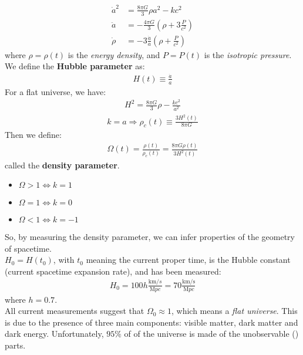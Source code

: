 \documentclass[../PhysUniverse.tex]{subfiles}
\begin{document}
\begin{align*}
\dot{a}^2 &= \frac{8\pi G}{3}\rho a^2 - kc^2\\
\ddot{a} &= -\frac{4\pi G}{3}\left(\rho + 3\frac{P}{c^2}\right)\\
\dot{\rho} &= -3\frac{\dot{a}}{a}\left(\rho + \frac{P}{c^2}\right)
\end{align*}
where $\rho=\rho(t)$ is the \textit{energy density}, and $P=P(t)$ is the \textit{isotropic pressure}.\\
We define the \textbf{Hubble parameter} as:
\begin{align*}
H(t) \equiv \frac{\dot{a}}{a}
\end{align*}
For a flat universe, we have:
\begin{align*}
H^2 = \frac{8\pi G}{3}\rho - \frac{kc^2}{a^2}
\end{align*}
\begin{align*}
k=a \Rightarrow \rho_c(t) \equiv \frac{3H^2(t)}{8\pi G}
\end{align*}
Then we define:
\begin{align*}
\Omega(t) = \frac{\rho(t)}{\rho_c(t)} = \frac{8\pi G \rho(t)}{3H^2(t)}
\end{align*}
called the \textbf{density parameter}.
\begin{itemize}
\item $\Omega > 1\Leftrightarrow k=1$
\item $\Omega = 1 \Leftrightarrow k=0$
\item $\Omega < 1 \Leftrightarrow k=-1$
\end{itemize}
So, by measuring the density parameter, we can infer properties of the geometry of spacetime.\\

$H_0 = H(t_0)$, with $t_0$ meaning the current proper time, is the Hubble constant (current spacetime expansion rate), and has been measured:
\begin{align*}
H_0 = 100h  \frac{\si{\km}/\si{s}}{\si{\mega pc}} =  70 \frac{\si{\kilo\m}/\si{\s}}{\si{\mega pc}}
\end{align*}
where $h=0.7$.\\
All current measurements suggest that $\Omega_0 \approx 1$, which means a \textit{flat universe}. This is due to the presence of three main components: visible matter, dark matter and dark energy. Unfortunately, $95\%$ of of the universe is made of the unobservable () parts.\\
\end{document}
